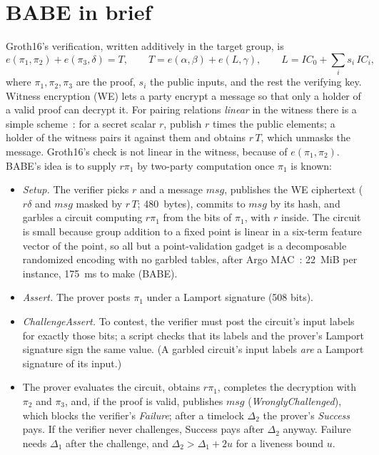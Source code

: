 \documentclass[11pt]{article}
\begin{document}
\section{BABE in brief}
\label{sec:babe}

Groth16's verification, written additively in the target group, is
\[
  e(\pi_1, \pi_2) + e(\pi_3, \delta) = T, \qquad
  T = e(\alpha, \beta) + e(L, \gamma), \qquad
  L = \mathit{IC}_0 + \textstyle\sum_i s_i\, \mathit{IC}_i,
\]
where $\pi_1, \pi_2, \pi_3$ are the proof, $s_i$ the public inputs, and
the rest the verifying key. Witness encryption (WE) lets a party encrypt
a message so that only a holder of a valid proof can decrypt it. For
pairing relations \emph{linear} in the witness there is a simple
scheme~\cite{gkpw24}: for a secret scalar $r$, publish $r$ times the
public elements; a holder of the witness pairs it against them and
obtains $r\,T$, which unmasks the message. Groth16's check is not linear
in the witness, because of $e(\pi_1, \pi_2)$. BABE's idea is to supply
$r\pi_1$ by two-party computation once $\pi_1$ is known:
\begin{itemize}[leftmargin=1.5em]
\item \emph{Setup.} The verifier picks $r$ and a message $\mathit{msg}$,
  publishes the WE ciphertext ($r\delta$ and $\mathit{msg}$ masked by
  $r\,T$; 480~bytes), commits to $\mathit{msg}$ by its hash, and
  garbles a circuit computing $r\pi_1$ from the bits of $\pi_1$, with $r$
  inside. The circuit is small because group addition to a fixed point
  is linear in a six-term feature vector of the point, so all but a
  point-validation gadget is a decomposable randomized encoding with no
  garbled tables, after Argo MAC~\cite{argo}: 22~MiB per instance, 175~ms
  to make (BABE).
\item \emph{Assert.} The prover posts $\pi_1$ under a Lamport signature
  (508 bits).
\item \emph{ChallengeAssert.} To contest, the verifier must post the
  circuit's input labels for exactly those bits; a script checks that
  its labels and the prover's Lamport signature sign the same value. (A
  garbled circuit's input labels \emph{are} a Lamport signature of its
  input.)
\item The prover evaluates the circuit, obtains $r\pi_1$, completes the
  decryption with $\pi_2$ and $\pi_3$, and, if the proof is valid,
  publishes $\mathit{msg}$ (\emph{WronglyChallenged}), which blocks the
  verifier's \emph{Failure}; after a timelock $\Delta_2$ the prover's
  \emph{Success} pays. If the verifier never challenges, Success pays
  after $\Delta_2$ anyway. Failure needs $\Delta_1$ after the challenge,
  and $\Delta_2 > \Delta_1 + 2u$ for a liveness bound $u$.
\end{itemize}
\end{document}

